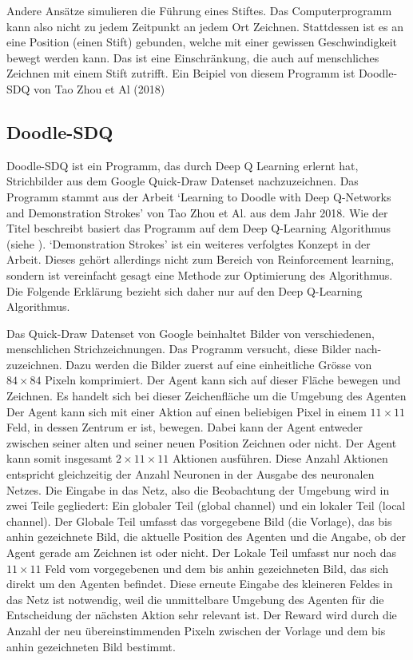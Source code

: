 Andere Ansätze simulieren die Führung eines Stiftes. Das Computerprogramm kann
also nicht zu jedem Zeitpunkt an jedem Ort Zeichnen. Stattdessen ist es an eine
Position (einen Stift) gebunden, welche mit einer gewissen Geschwindigkeit
bewegt werden kann. Das ist eine Einschränkung, die auch auf menschliches
Zeichnen mit einem Stift zutrifft. Ein Beipiel von diesem Programm ist Doodle-SDQ von Tao Zhou et Al (2018)

\subsection*{Doodle-SDQ}
Doodle-SDQ ist ein Programm, das durch Deep Q Learning erlernt hat, Strichbilder
aus dem Google Quick-Draw Datenset nachzuzeichnen. Das Programm stammt aus der
Arbeit `Learning to Doodle with Deep Q-Networks and Demonstration Strokes' von
Tao Zhou et Al. aus dem Jahr 2018. Wie der Titel beschreibt basiert das Programm
auf dem Deep Q-Learning Algorithmus (siehe ). `Demonstration
Strokes' ist ein weiteres verfolgtes Konzept in der Arbeit. Dieses gehört
allerdings nicht zum Bereich von Reinforcement learning, sondern ist vereinfacht
gesagt eine Methode zur Optimierung des Algorithmus. Die Folgende Erklärung
bezieht sich daher nur auf den Deep Q-Learning Algorithmus.

Das Quick-Draw Datenset von Google beinhaltet Bilder von verschiedenen,
menschlichen Strichzeichnungen. Das Programm versucht, diese Bilder
nach\hyp{}zuzeichnen. Dazu werden die Bilder zuerst auf eine einheitliche Grösse von
$84\times84$ Pixeln komprimiert. Der Agent kann sich auf dieser Fläche bewegen und
Zeichnen. Es handelt sich bei dieser Zeichenfläche um die Umgebung des Agenten
Der Agent kann sich mit einer Aktion auf einen beliebigen Pixel in einem $11\times11$
Feld, in dessen Zentrum er ist, bewegen. Dabei kann der Agent entweder zwischen
seiner alten und seiner neuen Position Zeichnen oder nicht. Der Agent kann somit
insgesamt $2\times11\times11$ Aktionen ausführen. Diese Anzahl Aktionen entspricht
gleichzeitig der Anzahl Neuronen in der Ausgabe des neuronalen Netzes. Die
Eingabe in das Netz, also die Beobachtung der Umgebung wird in zwei Teile
gegliedert: Ein globaler Teil (global channel) und ein lokaler Teil (local
channel). Der Globale Teil umfasst das vorgegebene Bild (die Vorlage), das bis
anhin gezeichnete Bild, die aktuelle Position des Agenten und die Angabe, ob der
Agent gerade am Zeichnen ist oder nicht. Der Lokale Teil umfasst nur noch das
$11\times11$ Feld vom vorgegebenen und dem bis anhin gezeichneten Bild, das sich direkt
um den Agenten befindet. Diese erneute Eingabe des kleineren Feldes in das Netz
ist notwendig, weil die unmittelbare Umgebung des Agenten für die Entscheidung
der nächsten Aktion sehr relevant ist. Der Reward wird durch die Anzahl der neu
übereinstimmenden Pixeln zwischen der Vorlage und dem bis anhin
gezeichneten Bild bestimmt.

